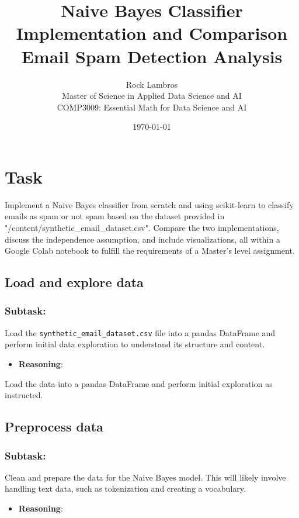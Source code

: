 \documentclass[12pt,a4paper]{article}
\title{Naive Bayes Classifier Implementation and Comparison\\
\large Email Spam Detection Analysis}
\author{Rock Lambros\\
Master of Science in Applied Data Science and AI\\
COMP3009: Essential Math for Data Science and AI}
\date{\today}
\begin{document}
\maketitle

\tableofcontents
\newpage


\section{Task}
Implement a Naive Bayes classifier from scratch and using scikit-learn to classify emails as spam or not spam based on the dataset provided in "/content/synthetic\_email\_dataset.csv". Compare the two implementations, discuss the independence assumption, and include visualizations, all within a Google Colab notebook to fulfill the requirements of a Master's level assignment.

\subsection{Load and explore data}

\subsubsection{Subtask:}
Load the \texttt{synthetic\_email\_dataset.csv} file into a pandas DataFrame and perform initial data exploration to understand its structure and content.


\begin{itemize}
    \item \textbf{Reasoning}:
\end{itemize}

Load the data into a pandas DataFrame and perform initial exploration as instructed.



\subsection{Preprocess data}

\subsubsection{Subtask:}
Clean and prepare the data for the Naive Bayes model. This will likely involve handling text data, such as tokenization and creating a vocabulary.


\begin{itemize}
    \item \textbf{Reasoning}:
\end{itemize}
\end{document}
